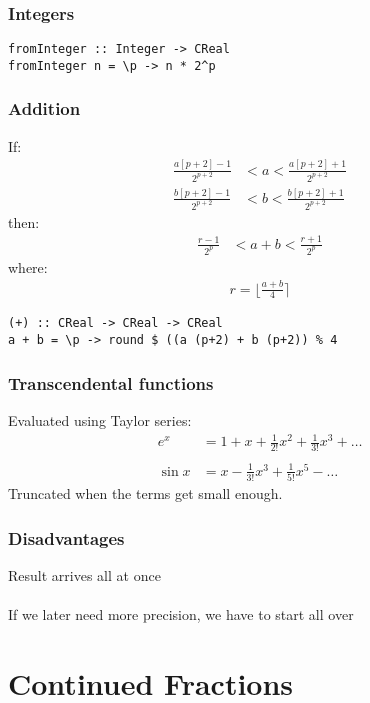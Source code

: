 \documentclass[11pt,aspectratio=169]{beamer}
\begin{document}
\begin{frame}[fragile]
\frametitle{Integers}
\begin{verbatim}
fromInteger :: Integer -> CReal
fromInteger n = \p -> n * 2^p
\end{verbatim}
\end{frame}

\begin{frame}[fragile]
\frametitle{Addition}
If:
\begin{align*}
\frac{a[p+2] - 1}{2^{p+2}} &< a < \frac{a[p+2] + 1}{2^{p+2}} \\
\frac{b[p+2] - 1}{2^{p+2}} &< b < \frac{b[p+2] + 1}{2^{p+2}}
\end{align*}
then:
\begin{align*}
\frac{r - 1}{2^p} &< a + b < \frac{r + 1}{2^p}
\end{align*}
where:
\begin{align*}
r = \lfloor \frac{a+b}{4} \rceil
\end{align*}
\begin{verbatim}
(+) :: CReal -> CReal -> CReal
a + b = \p -> round $ ((a (p+2) + b (p+2)) % 4
\end{verbatim}
\end{frame}

\begin{frame}[fragile]
\frametitle{Transcendental functions}
Evaluated using Taylor series:
\begin{align*}
e^x &= 1 + x + \frac{1}{2!}x^2 + \frac{1}{3!}x^3 + \dots \\
~\\
\sin x &= x - \frac{1}{3!}x^3 + \frac{1}{5!}x^5 - \dots
\end{align*}
Truncated when the terms get small enough.
\end{frame}

\begin{frame}
\frametitle{Disadvantages}
Result arrives all at once
\\~\\
If we later need more precision, we have to start all over
\end{frame}

\section{Continued Fractions}
\end{document}
